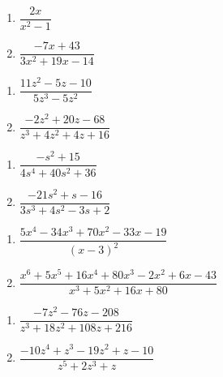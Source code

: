 \documentclass{ximera}
\begin{document}
\begin{multicols}{2}
\begin{enumerate}
\setcounter{enumi}{\value{HW}}

\item $\dfrac{2x}{x^{2} - 1}$  \label{findparfracfirst}
\item $\dfrac{-7x + 43}{3x^{2} + 19x - 14}$

\setcounter{HW}{\value{enumi}}
\end{enumerate}
\end{multicols}

\begin{multicols}{2}
\begin{enumerate}
\setcounter{enumi}{\value{HW}}

\item $\dfrac{11z^{2} - 5z - 10}{5z^{3} - 5z^{2}}$
\item $\dfrac{-2z^{2} + 20z - 68}{z^{3} + 4z^{2} + 4z + 16}$

\setcounter{HW}{\value{enumi}}
\end{enumerate}
\end{multicols}

\begin{multicols}{2}
\begin{enumerate}
\setcounter{enumi}{\value{HW}}

\item $\dfrac{-s^{2} + 15}{4s^{4} + 40s^{2} + 36}$
\item $\dfrac{-21s^{2} + s - 16}{3s^{3} + 4s^{2} - 3s + 2}$


\setcounter{HW}{\value{enumi}}
\end{enumerate}
\end{multicols}

\begin{multicols}{2}
\begin{enumerate}
\setcounter{enumi}{\value{HW}}

\item $\dfrac{5x^{4} - 34x^{3} + 70x^{2} - 33x - 19}{(x - 3)^{2}}$
\item $\dfrac{x^{6} + 5x^{5} + 16x^{4} + 80x^{3} - 2x^{2} + 6x - 43}{x^{3} + 5x^{2} + 16x + 80}$


\setcounter{HW}{\value{enumi}}
\end{enumerate}
\end{multicols}

\begin{multicols}{2}
\begin{enumerate}
\setcounter{enumi}{\value{HW}}

\item $\dfrac{-7z^{2} - 76z - 208}{z^{3} + 18z^{2} + 108z + 216}$
\item $\dfrac{-10z^{4} + z^{3} - 19z^{2} + z - 10}{z^{5} + 2z^{3} + z}$


\setcounter{HW}{\value{enumi}}
\end{enumerate}
\end{multicols}
\end{document}
